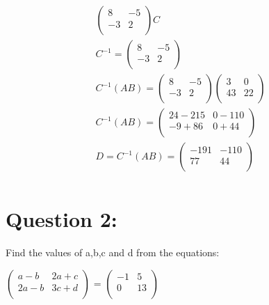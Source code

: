 \documentclass{article}
\begin{document}
\begin{align*}
\begin{pmatrix}
    8 & -5 \\ -3 & 2 \\ \end{pmatrix}C \\
    C^{-1} = \begin{pmatrix}
    8 & -5\\
    -3 & 2\\
\end{pmatrix}\\
C^{-1}(AB) = \begin{pmatrix}
    8 & -5\\
    -3 & 2\\
\end{pmatrix} \begin{pmatrix}
    3 & 0\\
    43 & 22\\
\end{pmatrix}\\ 
C^{-1}(AB) = \begin{pmatrix}
   24-215  & 0-110\\
    -9+86 & 0+44\\
\end{pmatrix} \\
D=C^{-1}(AB) = \begin{pmatrix}
    -191 & -110\\
    77 & 44\\
\end{pmatrix}\\
\end{align*}





\newpage

\section*{Question 2:}

Find the values of a,b,c and d from the equations:

$\begin{pmatrix}
    a-b & 2a + c\\
    2a-b & 3c + d\\
\end{pmatrix}$ = $\begin{pmatrix}
   -1 & 5 \\
    0 & 13\\
\end{pmatrix}$\\
\end{document}
